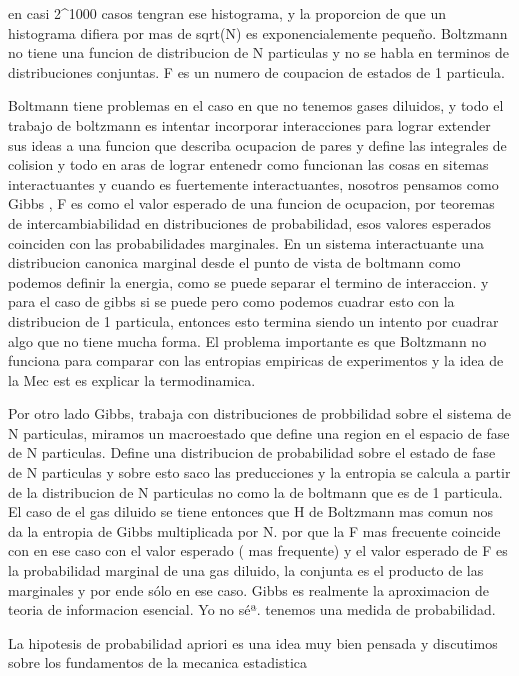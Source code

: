 en casi 2^1000 casos tengran ese histograma, y la proporcion de que un histograma difiera por mas de sqrt(N) es exponencialemente pequeño. Boltzmann no tiene una funcion de distribucion de N particulas y no se habla en terminos de distribuciones conjuntas. F es un numero de coupacion de estados de 1 particula.


Boltmann tiene problemas en el caso en que no tenemos gases diluidos, y todo el trabajo de boltzmann es intentar incorporar interacciones para lograr extender sus ideas a una funcion que describa ocupacion de pares y define las integrales de colision y todo en aras de lograr entenedr como funcionan las cosas en sitemas interactuantes y cuando es fuertemente interactuantes, nosotros pensamos como Gibbs , F es como el valor esperado de una funcion de ocupacion, por teoremas de intercambiabilidad en distribuciones de probabilidad, esos valores esperados coinciden con las probabilidades marginales.
En un sistema interactuante una distribucion canonica marginal desde el punto de vista de boltmann como podemos definir la energia, como se puede separar el termino de interaccion. y para el caso de gibbs si se puede pero como podemos cuadrar esto con la distribucion de 1 particula, entonces esto termina siendo un intento por cuadrar algo que no tiene mucha forma. El problema importante es que Boltzmann no funciona para comparar con las entropias empiricas de experimentos y la idea de la Mec est es explicar la termodinamica.



Por otro lado Gibbs, trabaja con distribuciones de probbilidad sobre el sistema de  N particulas, miramos un macroestado que define una region en el espacio de fase de N particulas. Define una distribucion de probabilidad sobre el estado de fase de N particulas y sobre esto saco las preducciones y la entropia se calcula a partir de la distribucion de N particulas no como la de boltmann que es de 1 particula. El caso de el gas diluido se tiene entonces que H de Boltzmann mas comun nos da la entropia de Gibbs multiplicada por N. por que la F mas frecuente coincide con en ese caso con el valor esperado ( mas frequente) y el valor esperado de F es la probabilidad marginal de una gas diluido, la conjunta es el producto de las marginales y por ende sólo en ese caso. Gibbs es realmente la aproximacion de teoria de informacion esencial. Yo no séª. tenemos una medida de probabilidad.

La hipotesis de probabilidad apriori es una idea muy bien pensada y discutimos sobre los fundamentos de la mecanica estadistica 

